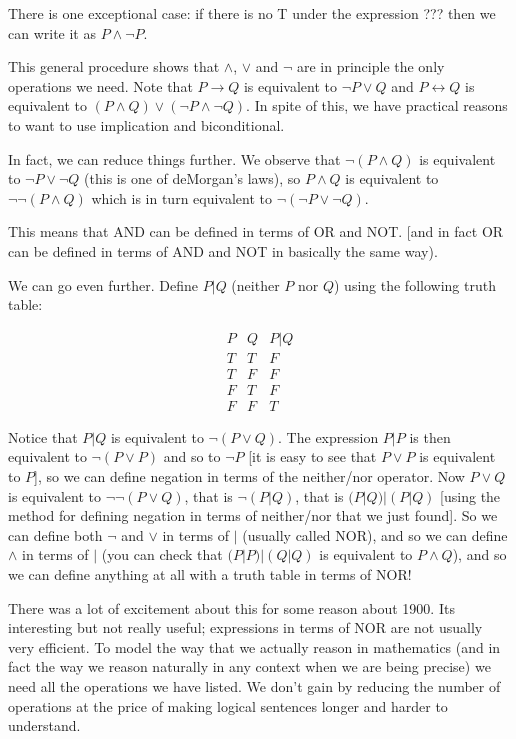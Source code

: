 \documentclass[12pt]{article}
\begin{document}
There is one exceptional case:  if there is no T under the expression ??? then we can write it as $P \wedge \neg P$.

This general procedure shows that $\wedge$, $\vee$ and $\neg$ are in principle the only operations we need.  Note that $P \rightarrow Q$ is equivalent to $\neg P \vee Q$ and $P \leftrightarrow Q$ is equivalent to $(P \wedge Q) \vee (\neg P \wedge \neg Q)$.  In spite of this,
we have practical reasons to want to use implication and biconditional.

In fact, we can reduce things further.  We observe that $\neg(P \wedge Q)$  is equivalent to $\neg P \vee \neg Q$ (this is one of deMorgan's laws),
so $P \wedge Q$ is equivalent to $\neg\neg(P \wedge Q)$ which is in turn equivalent to $\neg(\neg P \vee \neg Q)$.

This means that AND can be defined in terms of OR and NOT.  [and in fact OR can be defined in terms of AND and NOT in basically the same way).

We can go even further.  Define $P|Q$ (neither $P$ nor $Q$) using the following truth table:

$$\begin{array}{c|c|c} P  & Q & P | Q \\ \hline
                       T  & T &   F  \\
                       T  & F &   F  \\
                       F  & T &   F  \\
                       F  & F &   T \end{array}$$

Notice that $P|Q$ is equivalent to $\neg(P \vee Q)$.  The expression $P|P$ is then equivalent to $\neg(P \vee P)$ and so to $\neg P$
[it is easy to see that $P \vee P$ is equivalent to $P$], so we can define negation in terms of the neither/nor operator.  Now $P \vee Q$ is equivalent to $\neg\neg(P\vee Q)$, that is $\neg(P |Q)$, that is
$(P|Q)|(P|Q)$ [using the method for defining negation in terms of neither/nor that we just found].  So we can define both
$\neg$ and $\vee$ in terms of $|$ (usually called NOR), and so we can define $\wedge$ in terms of $|$ (you can check that
$(P|P)|(Q|Q)$ is equivalent to $P \wedge Q$), and so we can define anything at all with a truth table in terms of NOR!

There was a lot of excitement about this for some reason about 1900.  Its interesting but not really useful; expressions in terms of NOR are
not usually very efficient.  To model the way that we actually reason in mathematics (and in fact the way we reason naturally in any context when we are being precise) we need all the operations we have listed.  We don't gain by reducing the number of operations at the price of making logical sentences longer and harder to understand.
\end{document}
